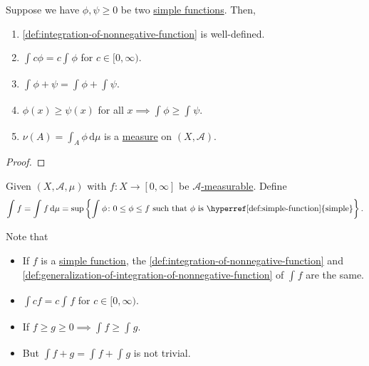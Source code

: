\begin{proposition}
	Suppose we have \(\phi, \psi \geq 0\) be two \hyperref[def:simple-function]{simple functions}. Then,
	\begin{enumerate}[(1)]
		\item \autoref{def:integration-of-nonnegative-function} is well-defined.
		\item \(\int_{}^{} c\phi = c \int_{}^{} \phi \) for \(c\in [0, \infty )\).
		\item \(\int_{}^{} \phi + \psi  =  \int_{}^{} \phi + \int_{}^{} \psi\).
		\item \(\phi (x) \geq \psi (x)\) for all \(x \implies \int_{}^{} \phi \geq \int_{}^{} \psi \).
		      \item\label{prop:nu-measure} \(\nu (A) = \int_{A}^{} \phi  \,\mathrm{d}\mu  \) is a \hyperref[def:measure]{measure} on \((X, \mathcal{A} )\).
	\end{enumerate}
\end{proposition}
\begin{proof}
\end{proof}

\begin{definition}\label{def:generalization-of-integration-of-nonnegative-function}
	Given \((X, \mathcal{A} , \mu )\) with \(f\colon X\to [0, \infty ]\) be \hyperref[def:A-measurable-function]{\(\mathcal{A}\)-measurable}.
	Define
	\[
		\int_{}^{} f= \int_{}^{} f \,\mathrm{d}\mu = \sup \left\{\int_{}^{} \phi \colon 0\leq \phi \leq f \text{ such that \(\phi\) is \hyperref[def:simple-function]{simple}}  \right\}.
	\]
\end{definition}
\begin{note}
	Note that
	\begin{itemize}
		\item If \(f\) is a \hyperref[def:simple-function]{simple function}, the \autoref{def:integration-of-nonnegative-function} and \autoref{def:generalization-of-integration-of-nonnegative-function}
		      of \(\int_{}^{} f \) are the same.
		\item \(\int cf = c\int_{}^{} f\) for \(c\in [0, \infty )\).
		\item If \(f\geq g \geq 0 \implies \int_{}^{} f\geq \int_{}^{} g\).
		\item But \(\int f+g = \int_{}^{} f + \int_{}^{} g\) is not trivial.
	\end{itemize}
\end{note}

